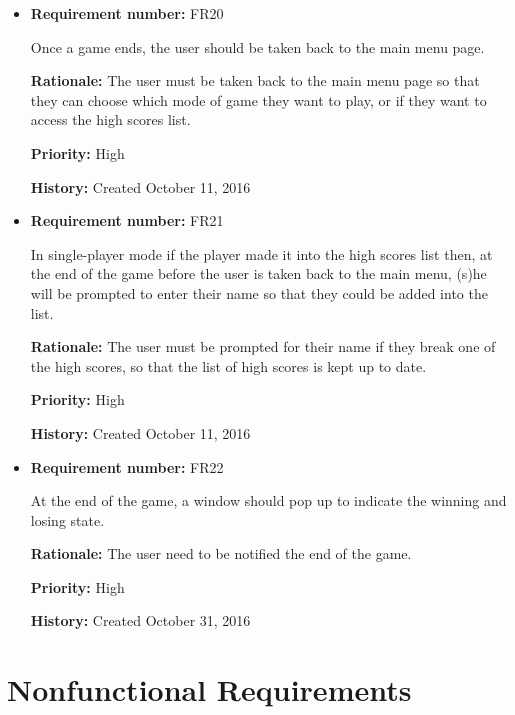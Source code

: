 \documentclass[12pt,letterpaper]{article}
\begin{document}
\begin{reqbox}
	\begin{itemize}
		\item \textbf{Requirement number: }FR20
	
		Once a game ends, the user should be taken back to the main menu page.

		\textbf{Rationale: }The user must be taken back to the main menu page so that they can choose which mode of game they want to play, or if they want to access the high scores list.

		\textbf{Priority: }High

		\textbf{History: }Created October 11, 2016
	\end{itemize}
\end{reqbox}

\begin{reqbox}
	\begin{itemize}
		\item \textbf{Requirement number: }FR21

		In single-player mode if the player made it into the high scores list then, at the end of the game before the user is taken back to the main menu, (s)he will be prompted to enter their name so that they could be added into the list.

		\textbf{Rationale: }The user must be prompted for their name if they break one of the high scores, so that the list of high scores is kept up to date.

		\textbf{Priority: }High

		\textbf{History: }Created October 11, 2016
	\end{itemize}
\end{reqbox}

\begin{reqbox}
	\begin{itemize}
		\item \textbf{Requirement number: }FR22

		At the end of the game, a window should pop up to indicate the winning and losing state.

		\textbf{Rationale: }The user need to be notified the end of the game.

		\textbf{Priority: }High

		\textbf{History: }Created October 31, 2016
	\end{itemize}
\end{reqbox}
		

\section{Nonfunctional Requirements}
\end{document}
